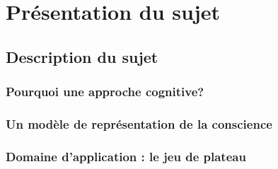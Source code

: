 \part{Présentation du sujet}

\clearemptydoublepage
\chapter{Description du sujet} 
\minitoc


\section{Pourquoi une approche cognitive?} 


\section{Un modèle de représentation de la conscience}
\label{un_modele_de_representation_de_la_conscience}


\section{Domaine d'application : le jeu de plateau}
